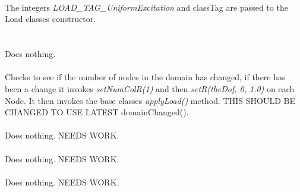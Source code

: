 \\ 
\\ \\
The integers {\em LOAD\_TAG\_UniformExcitation} and \p classTag are
passed to the Load classes constructor. \\

 \\
\\ 
Does nothing. \\

 \\ 
Checks to see if the number of nodes in the domain has changed, if
there has been a change it invokes {\em setNumColR(1)} and then 
{\em setR(theDof, 0, 1.0)} on each Node. It then invokes the base classes {\em
applyLoad()} method. THIS SHOULD BE CHANGED TO USE LATEST domainChanged().\\

\\
Does nothing. NEEDS WORK. \\

\\
Does nothing. NEEDS WORK. \\

\\
Does nothing. NEEDS WORK. 

